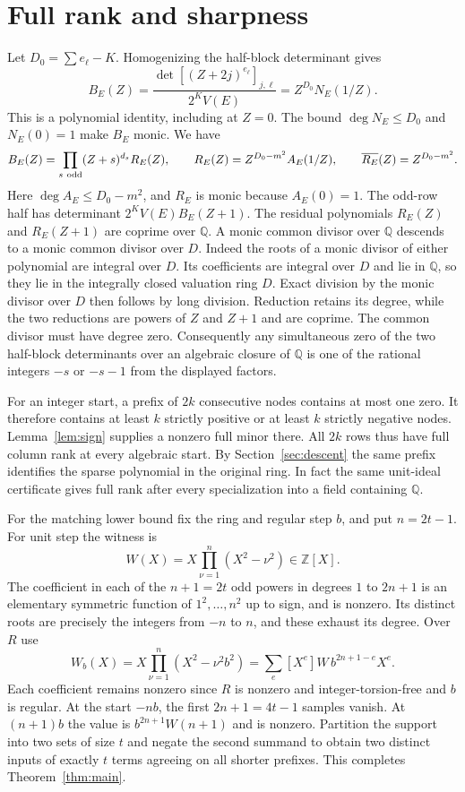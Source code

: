 \documentclass[10pt]{article}
\newcommand{\Z}{\mathbb Z}
\newcommand{\Q}{\mathbb Q}
\begin{document}
\section{Full rank and sharpness}\label{sec:full}
Let $D_0=\sum e_\ell-K$. Homogenizing the half-block determinant gives
\[
 B_E(Z)=\frac{\det[(Z+2j)^{e_\ell}]_{j,\ell}}{2^K V(E)}
       = Z^{D_0}N_E(1/Z).
\]
This is a polynomial identity, including at $Z=0$.
The bound $\deg N_E\le D_0$ and $N_E(0)=1$ make $B_E$ monic.
We have
\[
 B_E(Z)=\prod_{s\ {\rm odd}}(Z+s)^{d_s}R_E(Z),
 \qquad
 R_E(Z)=Z^{D_0-m^2}A_E(1/Z),
 \qquad \overline{R_E}(Z)=Z^{D_0-m^2}.
\]
Here $\deg A_E\le D_0-m^2$, and $R_E$ is monic because $A_E(0)=1$.
The odd-row half has determinant $2^K V(E)B_E(Z+1)$.
The residual polynomials $R_E(Z)$ and $R_E(Z+1)$ are coprime over
$\Q$. A monic common divisor over $\Q$ descends to a monic common
divisor over $D$. Indeed the roots of a monic divisor of either
polynomial are integral over $D$. Its coefficients are integral
over $D$ and lie in $\Q$, so they lie in the integrally closed
valuation ring $D$. Exact division by the monic divisor over $D$
then follows by long division. Reduction retains its degree, while
the two reductions are powers of $Z$ and $Z+1$ and are coprime.
The common divisor must have degree zero. Consequently any
simultaneous zero of the two
half-block determinants over an algebraic closure of $\Q$ is one
of the rational integers $-s$ or $-s-1$ from the displayed factors.

For an integer start, a prefix of $2k$ consecutive nodes contains
at most one zero. It therefore contains at least $k$ strictly positive
or at least $k$ strictly negative nodes. Lemma~\ref{lem:sign} supplies
a nonzero full minor there. All $2k$ rows thus have full column rank
at every algebraic start. By Section~\ref{sec:descent} the same
prefix identifies the sparse polynomial in the original ring.
In fact the same unit-ideal certificate gives full rank after every
specialization into a field containing $\Q$.

For the matching lower bound fix the ring and regular step $b$, and put
$n=2t-1$. For unit step the witness is
\[
 W(X)=X\prod_{\nu=1}^{n}(X^2-\nu^2)\in\Z[X].
\]
The coefficient in each of the $n+1=2t$ odd powers in degrees $1$ to
$2n+1$ is an elementary symmetric function of $1^2,\ldots,n^2$ up to
sign, and is nonzero. Its distinct roots are precisely the integers
from $-n$ to $n$, and these exhaust its degree. Over $R$ use
\[
 W_b(X)=X\prod_{\nu=1}^{n}(X^2-\nu^2 b^2)
       =\sum_e [X^e]W \, b^{2n+1-e}X^e.
\]
Each coefficient remains nonzero since $R$ is nonzero and
integer-torsion-free and $b$ is regular. At the start $-nb$, the first
$2n+1=4t-1$ samples vanish. At $(n+1)b$ the value is
$b^{2n+1}W(n+1)$ and is nonzero. Partition the support into
two sets of size $t$ and negate the second summand to obtain two
distinct inputs of exactly $t$ terms agreeing on all shorter prefixes.
This completes Theorem~\ref{thm:main}.
\end{document}

